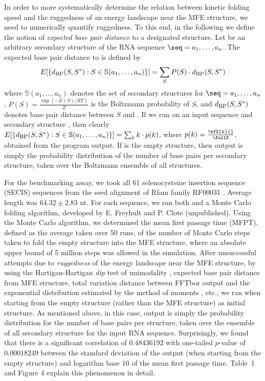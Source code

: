 In order to more systematically determine the relation between kinetic
folding speed and the ruggedness of an energy landscape near the MFE structure,
we need to numerically quantify ruggedness. To this end, in the following
we define the notion of {\em expected base pair distance} to a designated
structure. Let \strSt be an arbitrary secondary structure of the RNA sequence
$\seq = a_1,\dots,a_n$.
The expected base pair distance to \strSt is defined by
\begin{eqnarray}
\label{eq:expectedBasePairDist}
E[ \{ d_{\mbox{\sc bp}}(S,S^*): S \in \mathbb{S}(a_1,\ldots,a_n)\} ]  =
\sum_{S} P(S) \cdot d_{\mbox{\sc bp}}(S,S^*)
\end{eqnarray}
where
$\mathbb{S}(a_1,\ldots,a_n)$ denotes the set of secondary structures for
$\seq = a_1,\dots,a_n$, $P(S) = \frac{\exp(-E(S)/RT)}{Z}$ is the Boltzmann
probability of $S$, and
$d_{\mbox{\sc bp}}(S,S^*)$ denotes base pair distance between $S$ and \strSt.
If we run \fftbor on an input sequence \seq and secondary structure
\strSt, then clearly
$E[ \{ d_{\mbox{\sc bp}}(S,S^*): S \in \mathbb{S}(a_1,\ldots,a_n)\} ]  =
\sum_{k} k \cdot p(k)$, where $p(k)=\frac{\bfZ{k}{}}{\fullZ}$, obtained from the
program output.  If \strSt is the empty structure, then \fftbor output
is simply the probability distribution of the number of base pairs per
secondary structure, taken over the Boltzmann ensemble of all structures.

For the benchmarking assay, we took all 61 selenocysteine insertion sequence
(SECIS) sequences from the seed alignment of Rfam family RF00031
\citep{Gardner.nar11}. Average length was $64.32 \pm 2.83$ nt.
For each sequence, we ran both \fftbor and a Monte Carlo
folding algorithm, developed by E. Freyhult and P. Clote (unpublished).
Using the Monte Carlo algorithm, we
determined the mean first passage time (MFPT), defined as the average
taken over 50 runs, of the number of Monte Carlo steps taken to fold
the empty structure into the MFE structure, where an absolute upper bound
of 5 million steps was allowed in the simulation.  After unsuccessful
attempts due to {\em ruggedness} of the energy landscape near the MFE structure,
by using the Hartigan-Hartigan {\em dip} test of unimodality
\citep{hartiganDipTest},
expected base pair distance from MFE structure, total variation distance
between FFTbor output and the exponential distribution estimated by
the method of moments \citep{zar:biostatistics}, etc.,
we ran \fftbor
when starting from the empty structure (rather than the MFE structure)
as initial structure.
As mentioned above, in this case, \fftbor output is simply
the probability distribution
for the number of base pairs per structure, taken over the ensemble
of all secondary structure for the input RNA
sequence. Surprisingly, we found that there is a significant
correlation of  $0.48436192$ with one-tailed
$p$-value of $0.00018249$ between the
standard deviation of the \fftbor output (when starting from the
empty structure) and logarithm base $10$ of the mean first passage time.
Table~1 and Figure 4 explain this phenomenon in detail.

